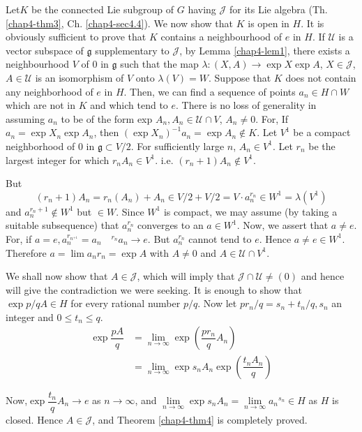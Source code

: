 Let\pageoriginale  $K$ be the connected Lie subgroup of $G$ having
$\mathscr{J}$ for 
its   Lie algebra (Th. \ref{chap4-thm3},  Ch. \ref{chap4-sec4.4}). We
now show that  $K$ is open 
in $H$.  It is obviously sufficient to prove that $K$ contains a
neighbourhood of $e$ in $H$. If $\mathcal{U}$ is a vector subspace of
$\mathfrak{g}$ supplementary to $\mathscr{J}$, by Lemma
\ref{chap4-lem1}, there exists a neighbourhood $V$ of $0$ in
$\mathfrak{g}$ such that the map 
$\lambda :(X, A)\rightarrow \exp  X \exp  A$, $ X \in
\mathscr{J}$, $A \in \mathcal{U} $ is an isomorphism of $V$ onto 
$\lambda(V)=W$. Suppose that $K$ does not contain any neighborhood of
$e$ in $H$. Then, we  can find a sequence of points $a_n \in H \cap W$
which are not in $K$ and which tend to $e$. There is no loss of
generality in assuming $a_n $ to be of the form exp $ A_n ,A_n \in
\mathcal{U} \cap V$, $A_n \ne 0$. For, If $a_n = \exp X_n  \exp A_n$,
then $(\exp X_n)^{-1} a_n = \exp A_n \notin K$. Let $ V^1$ be a compact
neighborhood of $0$ in  $\mathfrak{g} \subset V/2$. For  sufficiently
large $n$, $A_n \in V^1$. Let $r_n$  be the largest integer for which
$r_n A_n \in V^1$. i.e. $(r_n+1) A_n \notin V^1$. 

But  
$$
(r_n+1)A_n = r_n(A_n) +A_n \in V/2 + V/2=V\cdot a_n^{r_n} \in W^1=
\lambda(V^1) 
$$
and $a_n^{r_n+1} \notin W^1 $ but $\in W$. Since $W^1$ is compact,
we may assume (by taking a suitable subsequence) that $a_n ^{r_n}$
converges to an $ a \in W^1$. Now, we  assert that $ a \ne e$. For, if
$a =e, a_n^{r_{n^{+1}}}=a_n \quad ^{r_n}a_n \rightarrow e$. But
$a_n^{r_n}$ cannot tend to $e$. Hence $a \ne e \in
W^1$. Therefore $a = \lim a_n r_n = \exp A$ with $A \ne 0 $ and $A
\in \mathcal{U} \cap V^1$. 

We shall now show that $ A \in \mathscr{J}$, which will imply that
$\mathscr{J} \cap \mathcal{U} \ne (0)$ and hence will give the
contradiction we were seeking. It is enough to show that $\exp p/q  A
\in H$  for every rational number $p/q$. Now let $pr_n/q= s_n +
t_n/q,s_n $ an integer and $0 \le t_n \le q$. 
\begin{align*}
\exp \dfrac{pA}{q} & =\lim\limits_{n \rightarrow \infty}
\exp (\dfrac{pr_n }{q} A_n)\\ 
&=\lim\limits_{n \rightarrow \infty} \exp s_n A_n
\exp(\dfrac{t_nA_n}{q}) 
\end{align*}

Now,\pageoriginale $\exp  \dfrac{t_n}{q}  A_n \rightarrow  e$ as $n
\rightarrow \infty$,  and  $\lim\limits_{n \rightarrow \infty} \exp
s_n A_n = \lim\limits_{n \rightarrow \infty}  a_n {^{s_n}}\in H$ as
$H$ is closed. Hence $A \in \mathscr{J}$, and Theorem \ref{chap4-thm4}
is completely proved. 
  
